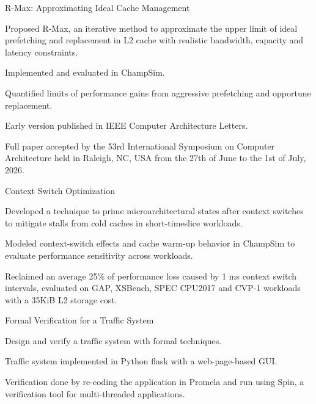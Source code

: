 
\begin{cventries}

    \cventry
    {}
    {R-Max: Approximating Ideal Cache Management}
    {}
    {}
    {
        \begin{cvitems}
            \item Proposed R-Max, an iterative method to approximate the upper limit of ideal prefetching and replacement in L2 cache with realistic bandwidth, capacity and latency constraints.
            \item Implemented and evaluated in ChampSim.
            \item Quantified limits of performance gains from aggressive prefetching and opportune replacement.
            \item Early version published in IEEE Computer Architecture Letters.
            \item Full paper accepted by the 53rd International Symposium on Computer Architecture held in Raleigh, NC, USA from the 27th of June to the 1st of July, 2026.
        \end{cvitems}
    }

    \cventry
    {}
    {Context Switch Optimization}
    {}
    {}
    {
        \begin{cvitems}
            \item Developed a technique to prime microarchitectural states after context switches to mitigate stalls from cold caches in short-timeslice workloads.
            \item Modeled context-switch effects and cache warm-up behavior in ChampSim to evaluate
            performance sensitivity across workloads.
            \item Reclaimed an average 25\% of performance loss caused by 1 ms context switch intervals, evaluated on GAP, XSBench, SPEC CPU2017 and CVP-1 workloads with a 35KiB L2 storage cost.
        \end{cvitems}
    }
    
    \cventry
    {}
    {Formal Verification for a Traffic System}
    {}
    {}
    {
        \begin{cvitems}
            \item Design and verify a traffic system with formal techniques.
            \item Traffic system implemented in Python flask with a web-page-based GUI.
            \item Verification done by re-coding the application in Promela and run using Spin, a verification tool for multi-threaded applications.
        \end{cvitems}
    }
    

\end{cventries}
